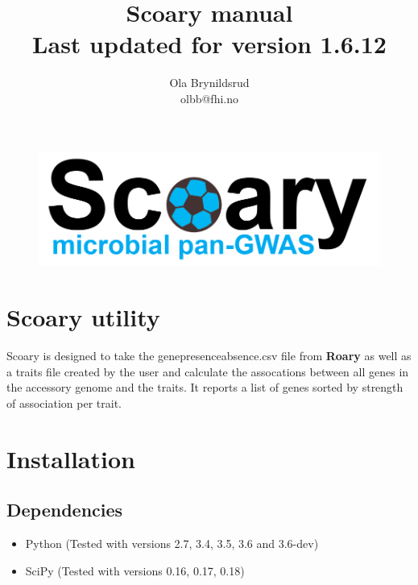 \documentclass{article}
\title{Scoary manual\\Last updated for version 1.6.12}
\date{}
\author{Ola Brynildsrud\\olbb@fhi.no}
\begin{document}

  \maketitle

  \newpage

  \tableofcontents

  \newpage


  \begin{figure}
    \includegraphics[width=\linewidth]{images/scoary_logo.png}
  \end{figure}

  \section{Scoary utility}

  Scoary \cite{brynildsrud2016rapid} is designed to take the gene\textunderscore presence\textunderscore absence.csv file from \textbf{Roary} \cite{page2015roary} as well as a traits file created by the user and calculate the assocations between all genes in the accessory genome and the traits. It reports a list of genes sorted by strength of association per trait.

  \section{Installation}

    \subsection{Dependencies}

    \begin{itemize}

      \item Python (Tested with versions 2.7, 3.4, 3.5, 3.6 and 3.6-dev)
      \item SciPy (Tested with versions 0.16, 0.17, 0.18)

    \end{itemize}
\end{document}

